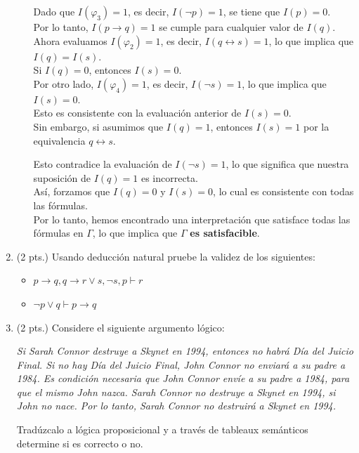 \documentclass[11pt,letterpaper]{article}
\begin{document}
\begin{enumerate}
\begin{itemize}
         Dado que $I(\varphi_3) = 1$, es decir, $I(\neg p) = 1$, se tiene que $I(p) = 0$.\\
         
         Por lo tanto, $I(p \rightarrow q) = 1$ se cumple para cualquier valor de $I(q)$.\\

         Ahora evaluamos $I(\varphi_2) = 1$, es decir, $I(q \leftrightarrow s) = 1$, lo que implica que $I(q) = I(s)$.\\
         
         Si $I(q) = 0$, entonces $I(s) = 0$.\\

         Por otro lado, $I(\varphi_4) = 1$, es decir, $I(\neg s) = 1$, lo que implica que $I(s) = 0$.\\
         
         Esto es consistente con la evaluación anterior de $I(s) = 0$.\\

         Sin embargo, si asumimos que $I(q) = 1$, entonces $I(s) = 1$ por la equivalencia $q \leftrightarrow s$.\
         
         Esto contradice la evaluación de $I(\neg s) = 1$, lo que significa que nuestra suposición de $I(q) = 1$ es incorrecta.\\

         Así, forzamos que $I(q) = 0$ y $I(s) = 0$, lo cual es consistente con todas las fórmulas.\\

         Por lo tanto, hemos encontrado una interpretación que satisface todas las fórmulas en $\Gamma$, lo que implica que $\Gamma$ \textbf{es satisfacible}.

    \end{itemize}

  \bigskip

  \item (2 pts.) Usando deducción natural pruebe la validez de los siguientes:

    \begin{itemize}
       \item $p \rightarrow q, q \rightarrow r \lor s, \neg s, p \vdash r$
       \item $\neg p \lor q \vdash p \rightarrow q$
    \end{itemize}

  \bigskip

  \item (2 pts.) Considere el siguiente argumento lógico:

    \textit{Si Sarah Connor destruye a Skynet en 1994, entonces no habrá Día del Juicio Final. Si no hay Día del Juicio Final, John Connor no enviará a su padre a 1984. Es condición necesaria que John Connor envíe a su padre a 1984, para que el mismo John nazca. Sarah Connor no destruye a Skynet en 1994, si John no nace. Por lo tanto, Sarah Connor no destruirá a Skynet en 1994.}

   Tradúzcalo a lógica proposicional y a través de tableaux semánticos determine si es correcto o no.

\end{enumerate}
\end{document}
